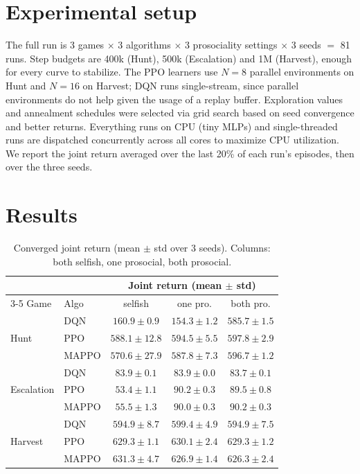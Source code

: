 \documentclass{article}
\begin{document}
\section{Experimental setup}
\label{sec:setup}

The full run is 3 games $\times$ 3 algorithms $\times$ 3 prosociality settings $\times$ 3
seeds $=$ 81 runs. Step budgets are 400k (Hunt), 500k (Escalation) and 1M (Harvest), enough
for every curve to stabilize. The PPO learners use $N=8$ parallel environments on Hunt and
$N=16$ on Harvest; DQN runs single-stream, since parallel environments do not help given the 
usage of a replay buffer. Exploration values and annealment schedules were selected via grid
search based on seed convergence and better returns. Everything runs on CPU (tiny MLPs) and single-threaded runs
are dispatched concurrently across all cores to maximize CPU utilization.
We report the joint return averaged over the last 20\% of each run's episodes, then over the
three seeds.

\newpage

\section{Results}
\label{sec:results}

\begin{table}[t]
  \centering
  \small
  \caption{Converged joint return (mean $\pm$ std over 3 seeds). Columns: both
  selfish, one prosocial, both prosocial.}
  \label{tab:results}
  \begin{tabular}{@{}ll ccc@{}}
    \toprule
    & & \multicolumn{3}{c}{Joint return (mean $\pm$ std)} \\
    \cmidrule(lr){3-5}
    Game & Algo & selfish & one pro. & both pro. \\
    \midrule
    \multirow{3}{*}{Hunt}
      & DQN  & $160.9\pm0.9$ & $154.3\pm1.2$ & $\mathbf{585.7\pm1.5}$ \\
      & PPO  & $588.1\pm12.8$ & $594.5\pm5.5$ & $597.8\pm2.9$ \\
      & MAPPO & $570.6\pm27.9$ & $587.8\pm7.3$ & $596.7\pm1.2$ \\
    \midrule
    \multirow{3}{*}{Escalation}
      & DQN  & $83.9\pm0.1$ & $83.9\pm0.0$ & $83.7\pm0.1$ \\
      & PPO  & $53.4\pm1.1$ & $\mathbf{90.2\pm0.3}$ & $89.5\pm0.8$ \\
      & MAPPO & $55.5\pm1.3$ & $90.0\pm0.3$ & $\mathbf{90.2\pm0.3}$ \\
    \midrule
    \multirow{3}{*}{Harvest}
      & DQN  & $594.9\pm8.7$ & $599.4\pm4.9$ & $594.9\pm7.5$ \\
      & PPO  & $629.3\pm1.1$ & $630.1\pm2.4$ & $629.3\pm1.2$ \\
      & MAPPO & $631.3\pm4.7$ & $626.9\pm1.4$ & $626.3\pm2.4$ \\
    \bottomrule
  \end{tabular}
\end{table}
\end{document}
